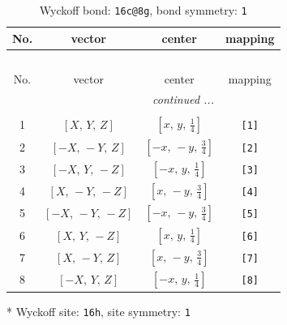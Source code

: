 \documentclass[fleqn,8pt]{jsarticle}
\begin{document}
\renewcommand{\arraystretch}{1.2}
\begin{longtable}{cccc}
\caption{Wyckoff bond: {\tt 16c@8g}, bond symmetry: {\tt 1}}
 \\
 \hline \hline
No. & vector & center & mapping \\ \hline \endfirsthead

\multicolumn{3}{l}{\tablename\ \thetable{}} \\
 \hline \hline
No. & vector & center & mapping \\ \hline \endhead

 \hline \hline
\multicolumn{3}{r}{\footnotesize\it continued ...} \\ \endfoot

 \hline \hline
\multicolumn{3}{r}{} \\ \endlastfoot

1 & $\left[ X,\, Y,\, Z \right]$ & $\left[ x,\, y,\, \frac{1}{4} \right]$ & {\tt [1]} \\ \hline
2 & $\left[ - X,\, - Y,\, Z \right]$ & $\left[ - x,\, - y,\, \frac{3}{4} \right]$ & {\tt [2]} \\ \hline
3 & $\left[ - X,\, Y,\, - Z \right]$ & $\left[ - x,\, y,\, \frac{1}{4} \right]$ & {\tt [3]} \\ \hline
4 & $\left[ X,\, - Y,\, - Z \right]$ & $\left[ x,\, - y,\, \frac{3}{4} \right]$ & {\tt [4]} \\ \hline
5 & $\left[ - X,\, - Y,\, - Z \right]$ & $\left[ - x,\, - y,\, \frac{3}{4} \right]$ & {\tt [5]} \\ \hline
6 & $\left[ X,\, Y,\, - Z \right]$ & $\left[ x,\, y,\, \frac{1}{4} \right]$ & {\tt [6]} \\ \hline
7 & $\left[ X,\, - Y,\, Z \right]$ & $\left[ x,\, - y,\, \frac{3}{4} \right]$ & {\tt [7]} \\ \hline
8 & $\left[ - X,\, Y,\, Z \right]$ & $\left[ - x,\, y,\, \frac{1}{4} \right]$ & {\tt [8]} \\
\end{longtable}
* Wyckoff site: {\tt 16h}, site symmetry: {\tt 1}
\renewcommand{\arraystretch}{1.2}
\end{document}
